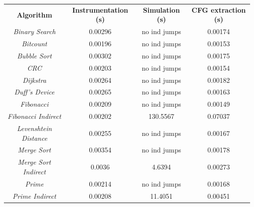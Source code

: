 \begin{table}
  \centering
  \begin{tabular}{|c|c|c|c|}
    \hline
    \textbf{Algorithm}                   & \textbf{Instrumentation (s)} & \textbf{Simulation (s)} & \textbf{CFG extraction (s)} \\
    \hhline{====} \textit{Binary Search} & 0.00296                      & no ind jumps            & 0.00174                     \\
    \hline
    \textit{Bitcount}                    & 0.00196                      & no ind jumps            & 0.00153                     \\
    \hline
    \textit{Bubble Sort}                 & 0.00302                      & no ind jumps            & 0.00175                     \\
    \hline
    \textit{CRC}                         & 0.00203                      & no ind jumps            & 0.00154                     \\
    \hline
    \textit{Dijkstra}                    & 0.00264                      & no ind jumps            & 0.00182                     \\
    \hline
    \textit{Duff's Device}               & 0.00265                      & no ind jumps            & 0.00163                     \\
    \hline
    \textit{Fibonacci}                   & 0.00209                      & no ind jumps            & 0.00149                     \\
    \hline
    \textit{Fibonacci Indirect}          & 0.00202                      & 130.5567                & 0.07037                     \\
    \hline
    \textit{Levenshtein Distance}        & 0.00255                      & no ind jumps            & 0.00167                     \\
    \hline
    \textit{Merge Sort}                  & 0.00354                      & no ind jumps            & 0.00178                     \\
    \hline
    \textit{Merge Sort Indirect}         & 0.0036                       & 4.6394                  & 0.00273                     \\
    \hline
    \textit{Prime}                       & 0.00214                      & no ind jumps            & 0.00168                     \\
    \hline
    \textit{Prime Indirect}              & 0.00208                      & 11.4051                 & 0.00451                     \\

\end{tabular}
\end{table}
